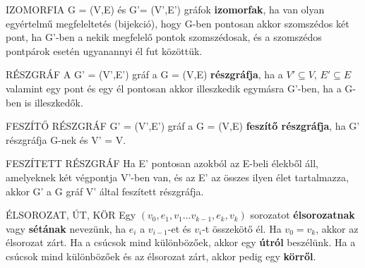 \begin{definicio}{IZOMORFIA}
G = (V,E) és G'= (V',E') gráfok \textbf{izomorfak}, ha van olyan egyértelmű megfeleltetés (bijekció), hogy G-ben pontosan akkor szomszédos két pont, ha G'-ben a nekik megfelelő pontok szomszédosak, és a szomszédos pontpárok esetén ugyanannyi él fut közöttük.
\end{definicio}

\begin{definicio}{RÉSZGRÁF}
A G' = (V',E') gráf a G = (V,E) \textbf{részgráfja}, ha a $V' \subseteq V$, $E' \subseteq E$ valamint egy pont és egy él pontosan akkor illeszkedik egymásra G'-ben, ha a G-ben is illeszkedők.
\end{definicio}

\begin{definicio}{FESZÍTŐ RÉSZGRÁF}
G' = (V',E') gráf a G = (V,E)\textbf{ feszítő részgráfja}, ha G' részgráfja G-nek és V' = V.
\end{definicio}

\begin{definicio}{FESZÍTETT RÉSZGRÁF}
Ha E' pontosan azokból az E-beli élekből áll, amelyeknek két végpontja V'-ben van, és az E' az összes ilyen élet tartalmazza, akkor G' a G gráf V' által feszített részgráfja.
\end{definicio}

\begin{definicio}{ÉLSOROZAT, ÚT, KÖR}
  Egy $(v_0, e_1, v_1 ... v_{k-1}, e_k, v_k)$ sorozatot \textbf{élsorozatnak} vagy \textbf{sétának} nevezünk, ha $e_i$ a $v_{i-1}$-et és $v_i$-t összekötő él. Ha $v_0 = v_k$, akkor az élsorozat zárt. Ha a csúcsok mind különbözőek, akkor egy \textbf{útról} beszélünk. Ha a csúcsok mind különbözőek és az élsorozat zárt, akkor pedig egy \textbf{körről}.
\end{definicio}



